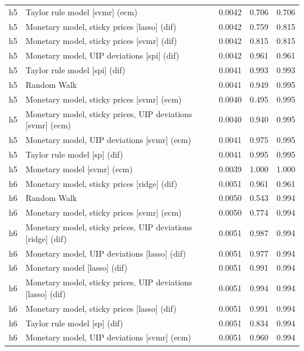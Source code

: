 \begin{ThreePartTable}
\begin{longtable}[t]{cp{5.5cm}ccc}
\addlinespace
h5 & \raggedright Taylor rule model [svmr] (ecm) & 0.0042 & 0.706 & 0.706\\
h5 & \raggedright Monetary model, sticky prices [lasso] (dif) & 0.0042 & 0.759 & 0.815\\
h5 & \raggedright Monetary model, sticky prices [svmr] (dif) & 0.0042 & 0.815 & 0.815\\
h5 & \raggedright Monetary model, UIP deviations [spi] (dif) & 0.0042 & 0.961 & 0.961\\
h5 & \raggedright Taylor rule model [spi] (dif) & 0.0041 & 0.993 & 0.993\\
h5 & \raggedright Random Walk & 0.0041 & 0.949 & 0.995\\
h5 & \raggedright Monetary model, sticky prices [svmr] (ecm) & 0.0040 & 0.495 & 0.995\\
h5 & \raggedright Monetary model, sticky prices, UIP deviations [svmr] (ecm) & 0.0040 & 0.940 & 0.995\\
h5 & \raggedright Monetary model, UIP deviations [svmr] (ecm) & 0.0041 & 0.975 & 0.995\\
h5 & \raggedright Taylor rule model [sp] (dif) & 0.0041 & 0.995 & 0.995\\
h5 & \raggedright Monetary model [svmr] (ecm) & 0.0039 & 1.000 & 1.000\\
\addlinespace
h6 & \raggedright Monetary model, sticky prices [ridge] (dif) & 0.0051 & 0.961 & 0.961\\
h6 & \raggedright Random Walk & 0.0050 & 0.543 & 0.994\\
h6 & \raggedright Monetary model, sticky prices [svmr] (ecm) & 0.0050 & 0.774 & 0.994\\
h6 & \raggedright Monetary model, sticky prices, UIP deviations [ridge] (dif) & 0.0051 & 0.987 & 0.994\\
h6 & \raggedright Monetary model, UIP deviations [lasso] (dif) & 0.0051 & 0.977 & 0.994\\
h6 & \raggedright Monetary model [lasso] (dif) & 0.0051 & 0.991 & 0.994\\
h6 & \raggedright Monetary model, sticky prices, UIP deviations [lasso] (dif) & 0.0051 & 0.994 & 0.994\\
h6 & \raggedright Monetary model, sticky prices [lasso] (dif) & 0.0051 & 0.991 & 0.994\\
h6 & \raggedright Taylor rule model [sp] (dif) & 0.0051 & 0.834 & 0.994\\
h6 & \raggedright Monetary model, UIP deviations [svmr] (ecm) & 0.0051 & 0.960 & 0.994\\

\end{longtable}
\end{ThreePartTable}
